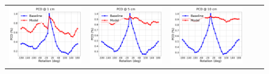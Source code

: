 \begin{figure}
\begin{tabular}{ccccc}
    \includegraphics[scale=0.1]{main/chapter04/data/plot_pcd_1_real} &
    \includegraphics[scale=0.1]{main/chapter04/data/plot_pcd_5_real} &
    \includegraphics[scale=0.1]{main/chapter04/data/plot_pcd_10_real}\\

\end{tabular}
\end{figure}
